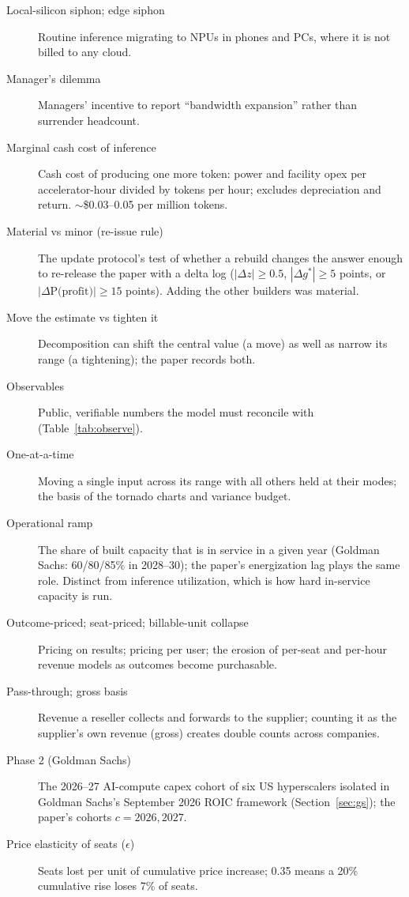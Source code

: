 \documentclass[11pt,letterpaper]{article}
\begin{document}
\begin{description}
\item[Local-silicon siphon; edge siphon] Routine inference migrating to NPUs in phones and PCs, where it is not billed to any cloud.
\item[Manager's dilemma] Managers' incentive to report ``bandwidth expansion'' rather than surrender headcount.
\item[Marginal cash cost of inference] Cash cost of producing one more token: power and facility opex per accelerator-hour divided by tokens per hour; excludes depreciation and return. $\sim$\$0.03--0.05 per million tokens.
\item[Material vs minor (re-issue rule)] The update protocol's test of whether a rebuild changes the answer enough to re-release the paper with a delta log ($|\Delta z|\ge0.5$, $|\Delta g^{*}|\ge5$ points, or $|\Delta \text{P(profit)}|\ge15$ points). Adding the other builders was material.
\item[Move the estimate vs tighten it] Decomposition can shift the central value (a move) as well as narrow its range (a tightening); the paper records both.
\item[Observables] Public, verifiable numbers the model must reconcile with (Table~\ref{tab:observe}).
\item[One-at-a-time] Moving a single input across its range with all others held at their modes; the basis of the tornado charts and variance budget.
\item[Operational ramp] The share of built capacity that is in service in a given year (Goldman Sachs: 60/80/85\% in 2028--30); the paper's energization lag plays the same role. Distinct from inference utilization, which is how hard in-service capacity is run.
\item[Outcome-priced; seat-priced; billable-unit collapse] Pricing on results; pricing per user; the erosion of per-seat and per-hour revenue models as outcomes become purchasable.
\item[Pass-through; gross basis] Revenue a reseller collects and forwards to the supplier; counting it as the supplier's own revenue (gross) creates double counts across companies.
\item[Phase 2 (Goldman Sachs)] The 2026--27 AI-compute capex cohort of six US hyperscalers isolated in Goldman Sachs's September 2026 ROIC framework (Section~\ref{sec:gs}); the paper's cohorts $c=2026, 2027$.
\item[Price elasticity of seats ($\epsilon$)] Seats lost per unit of cumulative price increase; 0.35 means a 20\% cumulative rise loses 7\% of seats.

\end{description}
\end{document}
